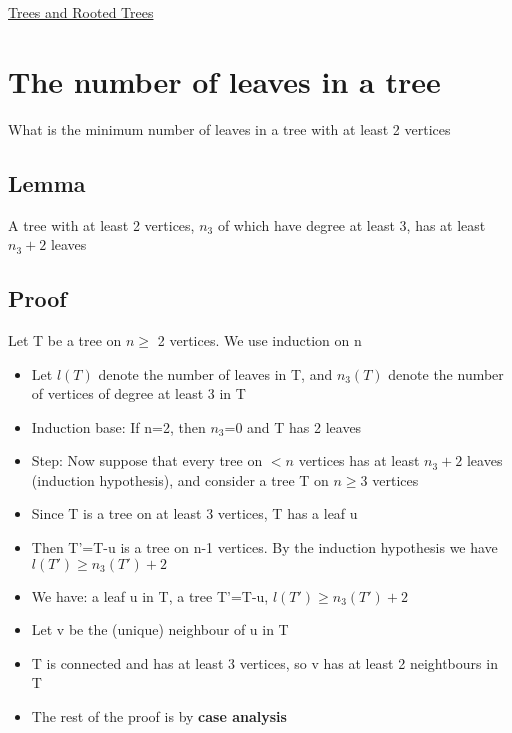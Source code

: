 \documentclass{article}[18pt]
\begin{document}
\begin{center}
\underline{\huge Trees and Rooted Trees}
\end{center}
\section{The number of leaves in a tree}
What is the minimum number of leaves in a tree with at least 2 vertices
\subsection{Lemma}
A tree with at least 2 vertices, $n_3$ of which have degree at least 3, has at least $n_3+2$ leaves
\subsection{Proof}
Let T be a tree on $n\geqslant$ 2 vertices. We use induction on n
\begin{itemize}
	\item Let $l(T)$ denote the number of leaves in T, and $n_3(T)$ denote the number of vertices of degree at least 3 in T
	\item Induction base: If n=2, then $n_3$=0 and T has 2 leaves
	\item Step: Now suppose that every tree on $< n$ vertices has at least $n_3+2$ leaves (induction hypothesis), and consider a tree T on $n\geqslant 3$ vertices
	\item Since T is a tree on at least 3 vertices, T has a leaf u
	\item Then T'=T-u is a tree on n-1 vertices. By the induction hypothesis we have $l(T')\geqslant n_3(T')+2$
	\item We have: a leaf u in T, a tree T'=T-u, $l(T')\geqslant n_3(T')+2$
	\item Let v be the (unique) neighbour of u in T
	\item T is connected and has at least 3 vertices, so v has at least 2 neightbours in T
	\item The rest of the proof is by \textbf{case analysis}
\end{itemize}
\end{document}
